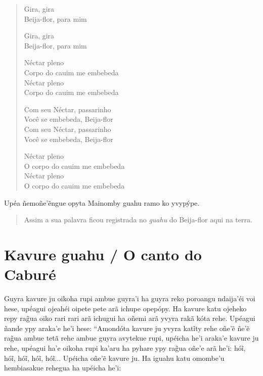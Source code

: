 \begin{itemize}

\begin{verse}
Gira, gira\\
Beija-flor, para mim

Gira, gira\\
Beija-flor, para mim

Néctar pleno\\
Corpo\footnotemark{} do cauim me embebeda\\
Néctar pleno\\
Corpo do cauim me embebeda

Com seu Néctar, passarinho\\
Você se embebeda, Beija-flor\\
Com seu Néctar, passarinho\\
Você se embebeda, Beija-flor

Néctar pleno\\
O corpo do cauim me embebeda\\
Néctar pleno\\
O corpo do cauim me embebeda
\end{verse}


Upéa ñemoñe'ẽngue opyta Mainomby guahu ramo ko yvypýpe.

\begin{quote}
Assim a sua palavra ficou registrada no \emph{guahu} do Beija-flor aqui
na terra.
\end{quote}

\chapter{Kavure guahu / O canto do Caburé}

Guyra kavure ju oikoha rupi ambue guyra'i ha guyra reko poroangu
ndaija'éi voi hese, upéagui ojeahéi oipete pete arã ichupe opepópy. Ha
kavure katu ojeheko repy rag̃ua oiko rari rari arã ichugui ha oñemi arã
yvyra rakã kóta rehe. Upéagui ñande ypy araka'e he'i hese: ``Amondóta
kavure ju yvyra katĩty rehe oñe'ẽ ñe'ẽ rag̃ua ambue tetã rehe ambue guyra
avytekue rupi, upéicha he'i araka'e kavure ju rehe, upéagui ha'e oikoha
rupi ka'aru ha pyhare ypy rag̃ua oñe'e arã he'i: hóĩ, hóĩ, hóĩ, hóĩ,
hóĩ... Upéicha oñe'ẽ kavure ju. Ha iguahu katu omombe'u hembiasakue
rehegua ha upéicha he'i:


\end{itemize}

